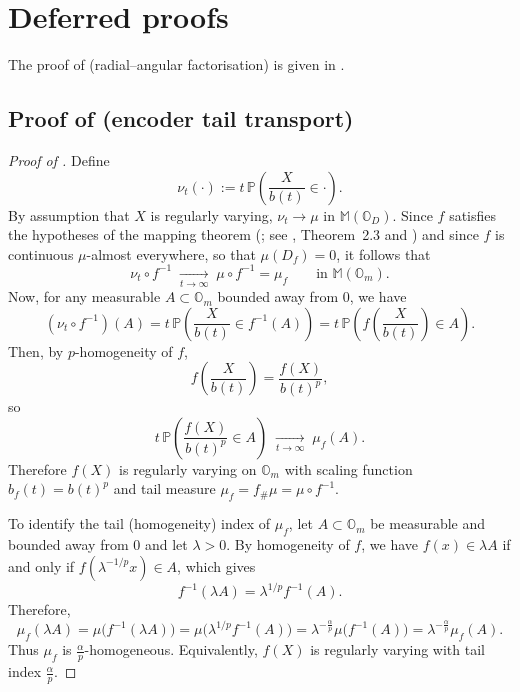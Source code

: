 \documentclass{article}
\theoremstyle{definition}
\begin{document}
\section{Deferred proofs}
\label{sec:appendix:proofs}

The proof of  (radial--angular factorisation) is given in .

\subsection{Proof of
\texorpdfstring{}{Proposition~\ref*{prop:reg-variation-under-homogeneous-encoders}}
(encoder tail transport)}
\label{sec:appendix:proof-encoder-tail-transport}

\begin{proof}[Proof of ]
Define
\[
\nu_t(\cdot)
:=
t\,\mathbb{P}\!\left(\frac{X}{b(t)}\in \cdot\right).
\]
By assumption that \(X\) is regularly varying, \(\nu_t \to \mu\) in \(\mathbb{M}(\mathbb{O}_D)\). Since \(f\) satisfies the hypotheses of the mapping theorem (; see \cite{lindskog_regularly_2014}, Theorem~2.3 and \cite[Prop.~3.12]{Resnick_2007}) and since \(f\) is continuous \(\mu\)-almost everywhere, so that \(\mu(D_f)=0\), it follows that
\[
\nu_t \circ f^{-1}
\;\xrightarrow[t\to\infty]{}\;
\mu\circ f^{-1}
=
\mu_f
\qquad
\text{in } \mathbb{M}(\mathbb{O}_m).
\]
Now, for any measurable \(A\subset\mathbb{O}_m\) bounded away from \(0\), we have
\[
(\nu_t\circ f^{-1})(A)
=
t\,\mathbb{P}\!\left(\frac{X}{b(t)} \in f^{-1}(A)\right)
=
t\,\mathbb{P}\!\left(f\!\left(\frac{X}{b(t)}\right)\in A\right).
\]
Then, by \(p\)-homogeneity of \(f\),
\[
f\!\left(\frac{X}{b(t)}\right)
=
\frac{f(X)}{b(t)^p},
\]
so
\[
t\,\mathbb{P}\!\left(\frac{f(X)}{b(t)^p}\in A\right)
\;\xrightarrow[t\to\infty]{}\;
\mu_f(A).
\]
Therefore \(f(X)\) is regularly varying on \(\mathbb{O}_m\) with scaling function \(b_f(t)=b(t)^p\) and tail measure \(\mu_f=f_{\#}\mu = \mu\circ f^{-1}\).

To identify the tail (homogeneity) index of \(\mu_f\), let \(A\subset\mathbb{O}_m\) be measurable and bounded away from \(0\) and let \(\lambda>0\). By homogeneity of \(f\), we have \(f(x)\in\lambda A\) if and only if \(f(\lambda^{-1/p}x)\in A\), which gives
\[
f^{-1}(\lambda A)=\lambda^{1/p} f^{-1}(A).
\]
Therefore,
\[
\mu_f(\lambda A)
=
\mu\bigl(f^{-1}(\lambda A)\bigr)
=
\mu\bigl(\lambda^{1/p} f^{-1}(A)\bigr)
=
\lambda^{-\frac{\alpha}{p}}\mu\bigl(f^{-1}(A)\bigr)
=
\lambda^{-\frac{\alpha}{p}}\mu_f(A).
\]
Thus \(\mu_f\) is \(\frac{\alpha}{p}\)-homogeneous. Equivalently, \(f(X)\) is regularly varying with tail index \(\frac{\alpha}{p}\).
\end{proof}
\end{document}
